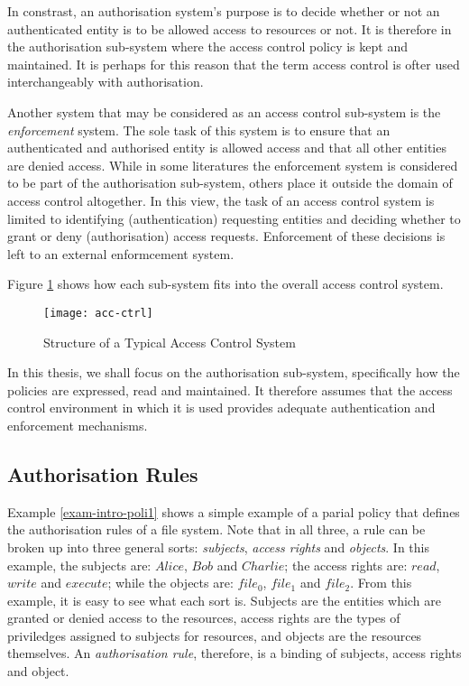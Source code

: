 \documentclass[11pt]{report}
\begin{document}
      In constrast, an authorisation system's purpose is to decide whether or
      not an authenticated entity is to be allowed access to resources or not.
      It is therefore in the authorisation sub-system where the access control
      policy is kept and maintained. It is perhaps for this reason that the
      term access control is ofter used interchangeably with authorisation.

      Another system that may be considered as an access control sub-system
      is the {\em enforcement} system. The sole task of this system is to
      ensure that an authenticated and authorised entity is allowed access and
      that all other entities are denied access. While in some literatures
      the enforcement system is considered to be part of the authorisation
      sub-system, others place it outside the domain of access control
      altogether. In this view, the task of an access control system is limited
      to identifying (authentication) requesting entities and deciding whether
      to grant or deny (authorisation) access requests. Enforcement of these
      decisions is left to an external enformcement system. 

      Figure \ref{figu-intro-acctl} shows how each sub-system fits into the
      overall access control system.

      \begin{figure}[tbhp]
        \begin{center}
          \texttt{[image: acc-ctrl]}
          \caption{Structure of a Typical Access Control System}
          \label{figu-intro-acctl}
        \end{center}
      \end{figure}

      In this thesis, we shall focus on the authorisation sub-system,
      specifically how the policies are expressed, read and maintained. It
      therefore assumes that the access control environment in which it is used
      provides adequate authentication and enforcement mechanisms.

      \subsection{Authorisation Rules}

        Example \ref{exam-intro-poli1} shows a simple example of a parial
        policy that defines the authorisation rules of a file system. Note that
        in all three, a rule can be broken up into three general sorts:
        {\em subjects}, {\em access rights} and {\em objects}. In this example,
        the subjects are: $Alice$, $Bob$ and $Charlie$; the access rights are:
        $read$, $write$ and $execute$; while the objects are: $file_0$,
        $file_1$ and $file_2$. From this example, it is easy to see what each
        sort is. Subjects are the entities which are granted or denied access
        to the resources, access rights are the types of priviledges assigned
        to subjects for resources, and objects are the resources themselves.
        An {\em authorisation rule}, therefore, is a binding of subjects,
        access rights and object.
\end{document}
